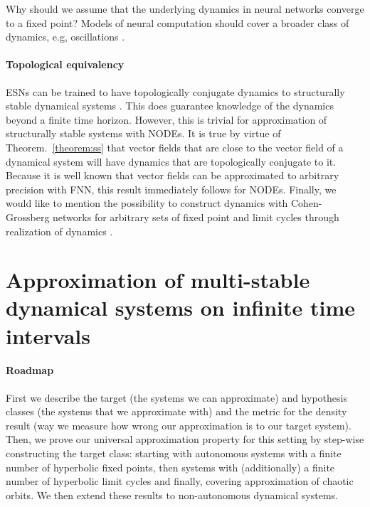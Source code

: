 \documentclass{article}
\theoremstyle{definition}
\theoremstyle{remark}
\newcounter{ct}
\begin{document}

Why should we assume that the underlying dynamics in neural networks converge to a fixed point?
Models of neural computation should cover a broader class of dynamics, e.g, oscillations \citep{townley2000existence, kag2020rnns, chang2019antisymmetricrnn,rapp1987periodic}. %




\paragraph{Topological equivalency}
ESNs can be trained to have  topologically conjugate dynamics to structurally stable dynamical systems \citep{hart2020embedding}.
This does guarantee knowledge of the dynamics beyond a finite time horizon.
However, this is trivial for approximation of structurally stable systems with NODEs.
It is true by virtue of Theorem.~\ref{theorem:ss} that vector fields that are close to the vector field of a dynamical system will have dynamics that are topologically conjugate to it.
Because it is well known that vector fields can be approximated to arbitrary precision with FNN, this result immediately follows for NODEs.
Finally, we would like to mention the possibility to construct dynamics with Cohen-Grossberg networks for arbitrary sets of fixed point and limit cycles through realization of dynamics \citep{cohen1992construction}.




\section{Approximation of multi-stable dynamical systems on infinite time intervals}
\paragraph{Roadmap}
First we describe the target (the systems we can approximate) and hypothesis classes (the systems that we approximate with) and the metric for the density result (way we measure how wrong our approximation is to our target system).
Then, we prove our universal approximation property for this setting by step-wise constructing the target class:
starting with autonomous systems with a finite number of hyperbolic fixed points,
then systems with (additionally) a finite number of hyperbolic limit cycles
and finally, covering approximation of chaotic orbits.
We then extend these results to non-autonomous dynamical systems.
\end{document}
